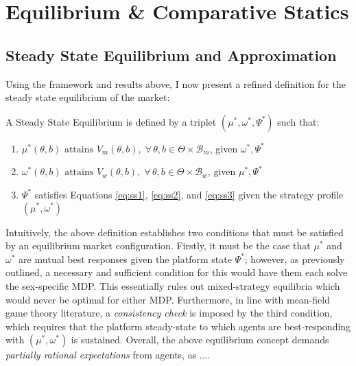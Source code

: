 \section{Equilibrium \& Comparative Statics}
\label{sec:section3} 
\subsection{Steady State Equilibrium and Approximation}\label{sec:section3.1} 
Using the framework and results above, I now present a refined definition for the steady state equilibrium of the market: 
\begin{definition}
    A Steady State Equilibrium is defined by a triplet $(\mu^*, \omega^*, \Psi^*)$ such that:
    \begin{enumerate}
        \item $ \mu^*(\theta,b) \text{ attains } V_m(\theta,b), \; \forall\, \theta, b \in \Theta \times \mathcal{B}_m$, given $\omega^*,\Psi^*$
        \item $ \omega^*(\theta,b) \text{ attains } V_w(\theta,b), \; \forall\, \theta, b \in \Theta \times \mathcal{B}_w$, given $\mu^*,\Psi^*$
        \item $\Psi^*$ satisfies Equations \ref{eq:ss1}, \ref{eq:ss2}, and \ref{eq:ss3} given the strategy profile $(\mu^*, \omega^*)$
    \end{enumerate} 
\end{definition}

Intuitively, the above definition establishes two conditions that must be satisfied by an equilibrium market configuration. Firstly, it must be the case that $\mu^*$ and $\omega^*$ are mutual best responses given the platform state $\Psi^*$; however, as previously outlined, a necessary and sufficient condition for this would have them each solve the sex-specific MDP. This essentially rules out mixed-strategy equilibria which would never be optimal for either MDP. Furthermore, in line with mean-field game theory literature, a \textit{consistency check} is imposed by the third condition, which requires that the platform steady-state to which agents are best-responding with $(\mu^*,\omega^*)$ is sustained. Overall, the above equilibrium concept demands \textit{partially rational expectations} from agents, as ....

